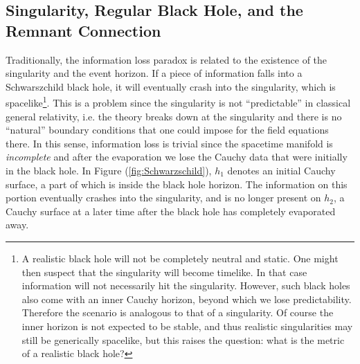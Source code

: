 \documentclass[12pt]{article}
\newcommand{\2}{$^2$}
\newcommand{\3}{$^3$}
\newcommand{\4}{$_4$}
\newcommand{\5}{$_5$}
\begin{document}
\subsection{Singularity, Regular Black Hole, and the Remnant Connection}\label{regular}

Traditionally, the information loss paradox is related to the existence of the singularity and the event horizon. If a piece of information falls into a Schwarszchild black hole, it will eventually crash into the singularity, which is spacelike\footnote{\color{black}A realistic black hole will not be completely neutral and static. One might then suspect that the singularity will become timelike. In that case information will not necessarily hit the singularity. However, such black holes also come with an inner Cauchy horizon, beyond which we lose predictability. Therefore the scenario is analogous to that of a singularity. Of course the inner horizon is not expected to be stable, and thus realistic singularities may still be generically spacelike, but this raises the question: what is the metric of a realistic black hole?}. This is a problem since the singularity is not ``predictable'' in classical general relativity, i.e. the theory breaks down at the singularity and there is no ``natural'' boundary conditions that one could impose for the field equations there. In this sense, information loss is trivial since the spacetime manifold is \emph{incomplete} and after the evaporation we lose the Cauchy data that were initially in the black hole. In Figure (\ref{fig:Schwarzschild}), $h_1$ denotes an initial Cauchy surface, a part of which is inside the black hole horizon. The information on this portion eventually crashes into the singularity, and is no longer present on $h_2$, a Cauchy surface at a later time after the black hole has completely evaporated away.
\end{document}

